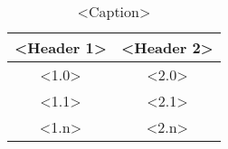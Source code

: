 \usepackage{graphicx}


\begin{table}[!ht] 						%
	\begin{center}						%
		\tableAppearance				%
		\caption{<Caption>}				%
		\label{tbl:<label name>}		%
		\begin{tabular}{cc}				%
			<Header 1> & <Header 2> \\ 	%
			\hline						%
			<1.0> & <2.0> \\			%
			<1.1> & <2.1> \\			%
			<1.n> & <2.n> \\			%
			\hline						%
		\end{tabular}					%
	\end{center}	
\end{table}